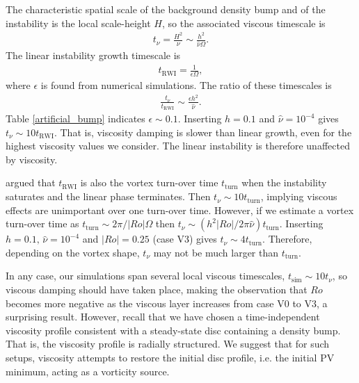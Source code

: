 The characteristic spatial scale of the background density bump and of
the instability is the local scale-height $H$, so the associated
viscous timescale is    
\begin{align}
  t_\nu = \frac{H^2}{\nu}\sim \frac{h^2}{\hat{\nu}\Omega}. 
\end{align}
The linear instability growth timescale is
\begin{align}
  t_\mathrm{RWI} = \frac{1}{\epsilon \Omega},
\end{align}
where $\epsilon$ is found from numerical simulations.   
The ratio of these timescales is
\begin{align}
  \frac{t_\nu}{t_\mathrm{RWI}} \sim \frac{\epsilon h^2}{\hat{\nu}}.
\end{align}
Table \ref{artificial_bump} indicates $\epsilon \sim 0.1$. 
Inserting $h=0.1$ and $\hat{\nu}=10^{-4}$ gives $t_\nu \sim 10
t_\mathrm{RWI}$. That is, viscosity damping is slower than linear
growth, even for the highest viscosity values we consider. 
The linear instability is therefore unaffected by viscosity. 

\cite{meheut13} argued that $t_\mathrm{RWI}$ is also the vortex
turn-over time $t_\mathrm{turn}$ when the instability saturates and
the linear phase terminates. Then 
$t_\nu\sim 10 t_\mathrm{turn}$, implying viscous effects 
are unimportant over one turn-over time. 
However, if we estimate a vortex turn-over time as $t_\mathrm{turn}
\sim 2\pi/|Ro|\Omega$ then $t_\nu\sim (h^2|Ro|/2\pi\hat{\nu})t_\mathrm{turn}$.  
Inserting $h=0.1,\,\hat{\nu}=10^{-4}$ and $|Ro|=0.25$ (case V3) gives 
$t_\nu \sim 4t_\mathrm{turn}$. Therefore, depending on the vortex shape, 
$t_\nu$ may not be much larger than $t_\mathrm{turn}$. 

In any case, our simulations span several local viscous timescales, 
$t_\mathrm{sim}\sim 10t_\nu $, so viscous damping should have taken
place, making the observation that $Ro$ becomes more negative as the 
viscous layer increases from case V0 to V3, a surprising
result. However, recall that we have chosen a  time-independent
viscosity profile consistent with a steady-state disc containing a
density bump. That is, the viscosity profile is radially
structured. We suggest that for such setups, viscosity attempts to
restore the initial disc profile, i.e. the initial PV minimum, acting
as a vorticity source.      

